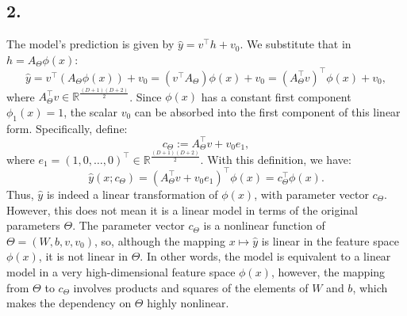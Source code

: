 \documentclass[12pt,a4paper]{article}
\begin{document}
    \subsection{2.}
        The model’s prediction is given by \(\hat{y} = v^\top h + v_0\). We substitute that in \(h = A_{\Theta} \phi(x)\):
        \[\hat{y} = v^\top (A_{\Theta} \phi(x)) + v_0 = (v^\top A_{\Theta}) \phi(x) + v_0 = (A_{\Theta}^\top v)^\top \phi(x) + v_0,\]
        where \(A_{\Theta}^\top v \in \mathbb{R}^\frac{(D+1)(D+2)}{2}\). Since \(\phi(x)\) has a constant first component \(\phi_1(x)=1\), the scalar \(v_0\) can be absorbed into the first component of this linear form. Specifically, define:
        \[c_{\Theta} := A_{\Theta}^\top v + v_0 e_1,\]
        where \(e_1 = (1,0,\ldots,0)^\top \in \mathbb{R}^{\frac{(D+1)(D+2)}{2}}\).
        With this definition, we have:
        \[\hat{y}(x; c_{\Theta}) = (A_{\Theta}^\top v + v_0 e_1)^\top \phi(x) = c_{\Theta}^\top \phi(x).\]
        Thus, \(\hat{y}\) is indeed a linear transformation of \(\phi(x)\), with parameter vector \(c_{\Theta}\). \\
        However, this does not mean it is a linear model in terms of the original parameters \(\Theta\). The parameter vector \(c_{\Theta}\) is a nonlinear function of \(\Theta = (W,b,v,v_0)\), so, although the mapping \(x \mapsto \hat{y}\) is linear in the feature space \(\phi(x)\), it is not linear in \(\Theta\). In other words, the model is equivalent to a linear model in a very high-dimensional feature space \(\phi(x)\), however, the mapping from \(\Theta\) to \(c_{\Theta}\) involves products and squares of the elements of \(W\) and \(b\), which makes the dependency on \(\Theta\) highly nonlinear.

    \newpage
\end{document}
